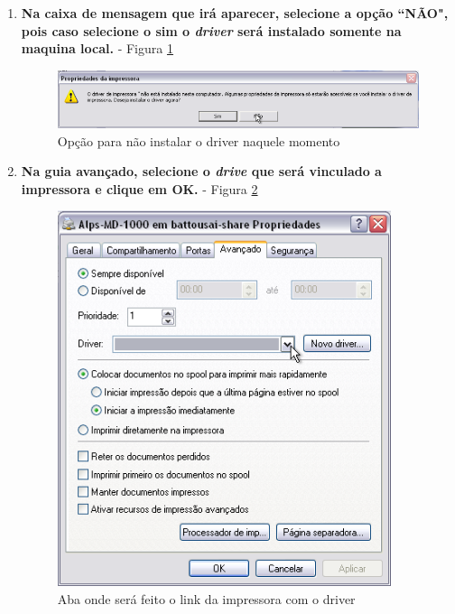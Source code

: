 \begin{enumerate}
	
	\item \textbf{Na caixa de mensagem que irá aparecer, selecione a opção ``NÃO", pois caso selecione o sim o \textit{driver} será instalado somente na maquina local.} - Figura \ref{opcao_nao}
	\begin{figure}[ht]
	   	\centering
	     \includegraphics[width=0.7 \textwidth]{figuras/opcao_nao}
	   	\caption{Opção para não instalar o driver naquele momento}
	    \label{opcao_nao}
	\end{figure}
	
	\item \textbf{Na guia avançado, selecione o \textit{drive} que será vinculado a impressora e clique em OK.} - Figura \ref{aba_avancado}
	\begin{figure}[ht]
	   	\centering
	     \includegraphics[width=0.7 \textwidth]{figuras/aba_avancado}
	   	\caption{Aba onde será feito o link da impressora com o driver}
	    \label{aba_avancado}
	\end{figure}
	
		\pagebreak
		

\end{enumerate}
